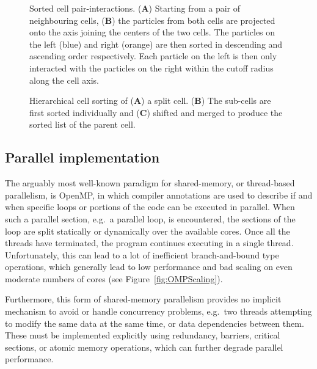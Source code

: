 \documentclass[final]{siamltex}
\newcommand{\fig}[1]
    {Figure~\ref{fig:#1}}
\newcommand{\bsf}[1]
    {\textbf{\textsf{#1}}}
\begin{document}
\begin{figure}
    \centerline{}
    
    \caption{Sorted cell pair-interactions. ({\bsf A}) Starting from a pair of
        neighbouring cells, ({\bsf B}) the particles from both cells
        are projected onto the axis joining the centers of the two cells.
        The particles on the left (blue) and right (orange) are
        then sorted in descending and ascending order respectively.
        Each particle on the left is then only interacted with
        the particles on the right within the cutoff radius along the cell axis.
        }
    \label{fig:SortedInteractions}
\end{figure}


\begin{figure}
    \centerline{}
    
    \caption{Hierarchical cell sorting of ({\bsf A}) a split cell.
        ({\bsf B}) The sub-cells are first sorted individually and
        ({\bsf C}) shifted and merged to produce the sorted list
        of the parent cell.
        }
    \label{fig:HierarchySorting}
\end{figure}


\subsection{Parallel implementation}

The arguably most well-known paradigm for shared-memory,
or thread-based parallelism, is OpenMP, in which
compiler annotations are used to describe if and when
specific loops or portions of the code can be executed
in parallel.
When such a parallel section, e.g.~a parallel loop, is
encountered, the sections of the loop are split statically
or dynamically over the available cores.
Once all the threads have terminated, the program continues
executing in a single thread.
Unfortunately, this can lead to a lot of inefficient
branch-and-bound
type operations, which generally lead to low performance and
bad scaling on even moderate numbers of cores (see \fig{OMPScaling}).

Furthermore, this form of shared-memory parallelism provides
no implicit mechanism to avoid or handle concurrency problems,
e.g.~two threads attempting to modify the same data at the same time,
or data dependencies between them.
These must be implemented explicitly using redundancy, barriers,
critical sections, or atomic memory operations, which can further degrade
parallel performance.
\end{document}
